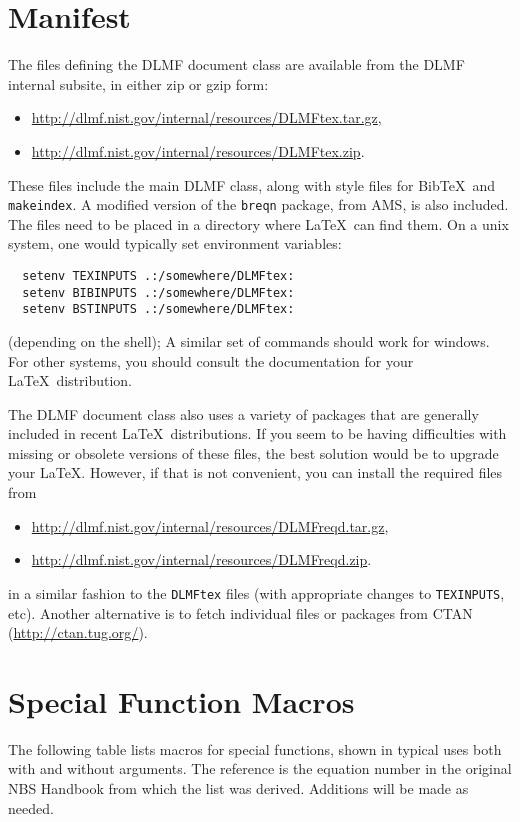 \documentclass[twoside]{article}
\newcommand{\token}[1]{\texttt{#1}}
\newcommand{\BibTeX}{Bib\TeX}
\begin{document}



\appendix
\section{Manifest}\label{app:manifest}
The files defining the DLMF document class are available from the DLMF internal subsite,
in either zip or gzip form:
\begin{itemize}
 \item \url{http://dlmf.nist.gov/internal/resources/DLMFtex.tar.gz},
 \item \url{http://dlmf.nist.gov/internal/resources/DLMFtex.zip}.
\end{itemize}
These files include the main DLMF class, along with style files for \BibTeX\ and
\token{makeindex}. A modified version of the \token{breqn} package, from AMS, is
also included.  The files need to be placed in a directory where \LaTeX\ can find them.
On a unix system, one would typically set environment variables:
\begin{verbatim}
  setenv TEXINPUTS .:/somewhere/DLMFtex:
  setenv BIBINPUTS .:/somewhere/DLMFtex:
  setenv BSTINPUTS .:/somewhere/DLMFtex:
\end{verbatim}
(depending on the shell); A similar set of commands should work for windows.
For other systems, you should consult the documentation for your \LaTeX\ distribution.

The DLMF document class also uses a variety of packages that are generally
included in recent \LaTeX\ distributions.  If you seem to be having difficulties
with missing or obsolete versions of these files, the best solution would be to
upgrade your \LaTeX.  However, if that is not convenient, you can install the required
files from 
\begin{itemize}
 \item \url{http://dlmf.nist.gov/internal/resources/DLMFreqd.tar.gz},
 \item \url{http://dlmf.nist.gov/internal/resources/DLMFreqd.zip}.
\end{itemize}
in a similar fashion to the \token{DLMFtex} files (with appropriate changes to
\texttt{TEXINPUTS}, etc).
Another alternative is to fetch individual files or packages from
CTAN (\url{http://ctan.tug.org/}).

\section{Special Function Macros}\label{app:specfuns}
The following table lists macros for special functions, shown in typical
uses both with and without arguments.  The reference is the
equation number in the original NBS Handbook from which
the list was derived.  Additions will be made as needed.

\clearpage
\begin{landscape}

\end{landscape}
\end{document}
